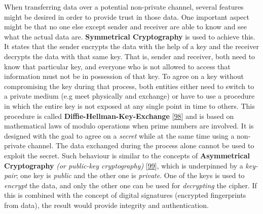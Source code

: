 \documentclass[12pt,english,a4paper,titlepage,cleardoublepage=empty,dottedtoc]{report}
\begin{document}
When transferring data over a potential non-private channel, several
features might be desired in order to provide trust in those data. One
important aspect might be that no one else except sender and receiver
are able to know and see what the actual data are. \textbf{Symmetrical
Cryptography} is used to achieve this. It states that the sender
encrypts the data with the help of a key and the receiver decrypts the
data with that same key. That is, sender and receiver, both need to know
that particular key, and everyone who is not allowed to access that
information must not be in possession of that key. To agree on a key
without compromising the key during that process, both entities either
need to switch to a private medium (e.g meet physically and exchange) or
have to use a procedure in which the entire key is not exposed at any
single point in time to others. This procedure is called
\textbf{Diffie-Hellman-Key-Exchange}
{[}\protect\hyperlink{ref-paper_1976_d-h-key-exchange}{98}{]} and is
based on mathematical laws of modulo operations when prime numbers are
involved. It is designed with the goal to agree on a \emph{secret} while
at the same time using a non-private channel. The data exchanged during
the process alone cannot be used to exploit the secret. Such behaviour
is similar to the concepts of
\textbf{\protect\hypertarget{def--asym-crypto}{}{Asymmetrical
Cryptography}} \emph{(or public-key cryptography)}
{[}\protect\hyperlink{ref-book_2014_chapter-9-1-public-key-crypto}{99}{]},
which is underpinned by a \emph{key-pair}; one key is \emph{public} and
the other one is \emph{private}. One of the keys is used to
\emph{encrypt} the data, and only the other one can be used for
\emph{decrypting} the cipher. If this is combined with the concept of
digital signatures (encrypted fingerprints from data), the result would
provide integrity and authentication.
\end{document}
